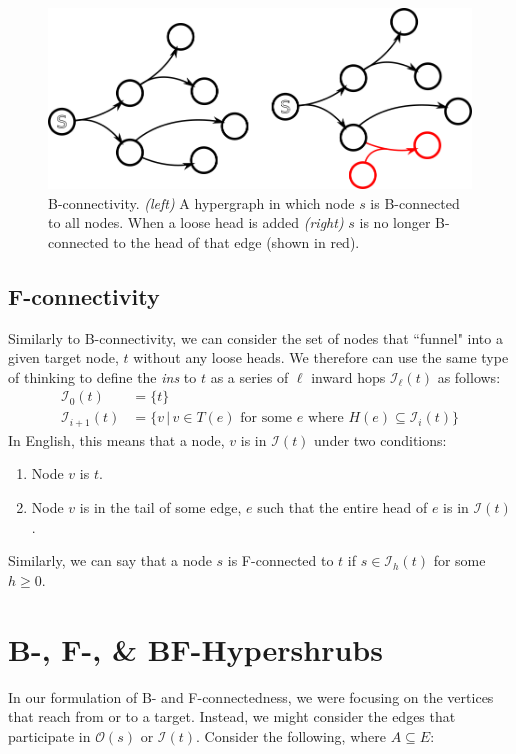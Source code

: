 \documentclass[12pt,twoside]{reedthesis}
\theoremstyle{definition}
\begin{document}
\begin{figure}[h]
  \begin{center}
    \includegraphics[width=\textwidth]{B-hypergraph}
  \caption[B-connectivity.]{B-connectivity. \textit{(left) }A hypergraph in which node $s$ is B-connected to all nodes. When a loose head is added \textit{(right)} $s$ is no longer B-connected to the head of that edge (shown in red).}
  \label{fig:B-Hypergraph}
  \end{center}
\end{figure}

\subsection{F-connectivity}
Similarly to B-connectivity, we can consider the set of nodes that ``funnel" into a given target node, $t$ without any loose heads. We therefore can use the same type of thinking to define the \textit{ins} to $t$ as a series of $\ell$ inward hops $\mathcal{I}_\ell(t)$ as follows:
\begin{align*}
  \mathcal{I}_0(t)&=\{t\}\\
  \mathcal{I}_{i+1}(t)&=\{v \,|\, v \in T(e) \text{ for some } e \text{ where } H(e) \subseteq \mathcal{I}_i(t)\}
\end{align*}
In English, this means that a node, $v$ is in $\mathcal{I}(t)$ under two conditions:
\begin{enumerate}
  \item{Node $v$ is $t$.}
  \item{Node $v$ is in the tail of some edge, $e$ such that the entire head of $e$ is in $\mathcal{I}(t)$.}
\end{enumerate}
Similarly, we can say that a node $s$ is F-connected to $t$ if $s \in \mathcal{I}_h(t)$ for some $h \geq 0$.

\section{B-, F-, \& BF-Hypershrubs}
In our formulation of B- and F-connectedness, we were focusing on the vertices that reach from or to a target. Instead, we might consider the edges that participate in $\mathcal{O}(s)$ or $\mathcal{I}(t)$. Consider the following, where $A \subseteq E$:
\end{document}
